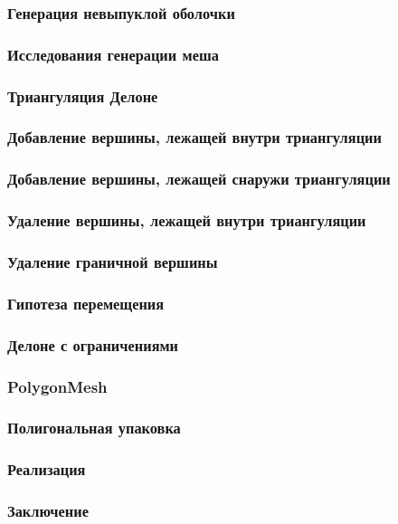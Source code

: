 \documentclass[10pt, unicode]{beamer}
\begin{document}
    \begin{frame}
        \frametitle{Генерация невыпуклой оболочки}
    \end{frame}
    \begin{frame}
        \frametitle{Исследования генерации меша}
    \end{frame}
    \begin{frame}
        \frametitle{Триангуляция Делоне}
    \end{frame}
    \begin{frame}
        \frametitle{Добавление вершины, лежащей внутри триангуляции}
    \end{frame}
    \begin{frame}
        \frametitle{Добавление вершины, лежащей снаружи триангуляции}
    \end{frame}
    \begin{frame}
        \frametitle{Удаление вершины, лежащей внутри триангуляции}
    \end{frame}
    \begin{frame}
        \frametitle{Удаление граничной вершины}
    \end{frame}
    \begin{frame}
        \frametitle{Гипотеза перемещения}
    \end{frame}
    \begin{frame}
        \frametitle{Делоне с ограничениями}
    \end{frame}
    \begin{frame}
        \frametitle{PolygonMesh}
    \end{frame}
    \begin{frame}
        \frametitle{Полигональная упаковка}
    \end{frame}
    \begin{frame}
        \frametitle{Реализация}
    \end{frame}
    \begin{frame}
        \frametitle{Заключение}
    \end{frame}
\end{document}
